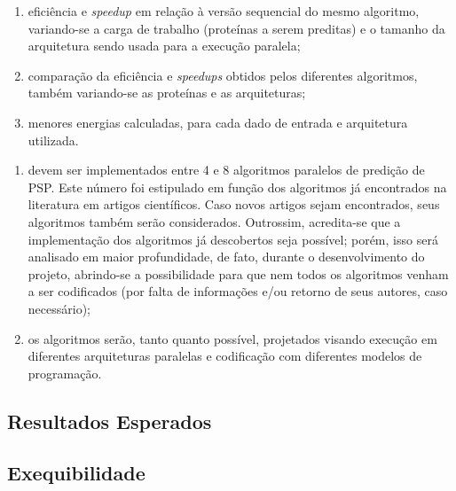 \begin{enumerate}
    \item eficiência e \textit{speedup} em relação à versão sequencial do mesmo algoritmo, variando-se a carga de trabalho (proteínas a serem preditas) e o tamanho da arquitetura sendo usada para a execução paralela;
    \item comparação da eficiência e \textit{speedups} obtidos pelos diferentes algoritmos, também variando-se as proteínas e as arquiteturas;
    \item menores energias calculadas, para cada dado de entrada e arquitetura utilizada.
\end{enumerate}

\begin{enumerate}
    \item devem ser implementados entre 4 e 8 algoritmos paralelos de predição de PSP. Este número foi estipulado em função dos algoritmos já encontrados na literatura em artigos científicos. Caso novos artigos sejam encontrados, seus algoritmos também serão considerados. Outrossim, acredita-se que a implementação dos algoritmos já descobertos seja possível; porém, isso será analisado em maior profundidade, de fato, durante o desenvolvimento do projeto, abrindo-se a possibilidade para que nem todos os algoritmos venham a ser codificados (por falta de informações e/ou retorno de seus autores, caso necessário);
    
    \item os algoritmos serão, tanto quanto possível, projetados visando execução em diferentes arquiteturas paralelas e codificação com diferentes modelos de programação.
\end{enumerate}

\subsection{Resultados Esperados}

\subsection{Exequibilidade}